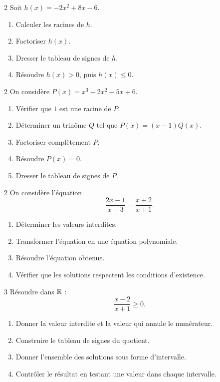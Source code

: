 \begin{exo}{2}
Soit $h(x)=-2x^2+8x-6$.
\begin{enumerate}
  \item Calculer les racines de $h$.
  \item Factoriser $h(x)$.
  \item Dresser le tableau de signes de $h$.
  \item Résoudre $h(x)>0$, puis $h(x)\leq0$.
\end{enumerate}
\end{exo}

\begin{exo}{2}
On considère $P(x)=x^3-2x^2-5x+6$.
\begin{enumerate}
  \item Vérifier que $1$ est une racine de $P$.
  \item Déterminer un trinôme $Q$ tel que $P(x)=(x-1)Q(x)$.
  \item Factoriser complètement $P$.
  \item Résoudre $P(x)=0$.
  \item Dresser le tableau de signes de $P$.
\end{enumerate}
\end{exo}

\begin{exo}{2}
On considère l'équation
\[
  \frac{2x-1}{x-3}=\frac{x+2}{x+1}.
\]
\begin{enumerate}
  \item Déterminer les valeurs interdites.
  \item Transformer l'équation en une équation polynomiale.
  \item Résoudre l'équation obtenue.
  \item Vérifier que les solutions respectent les conditions d'existence.
\end{enumerate}
\end{exo}

\begin{exo}{3}
Résoudre dans $\mathbb{R}$ :
\[
  \frac{x-2}{x+1}\geq0.
\]
\begin{enumerate}
  \item Donner la valeur interdite et la valeur qui annule le numérateur.
  \item Construire le tableau de signes du quotient.
  \item Donner l'ensemble des solutions sous forme d'intervalle.
  \item Contrôler le résultat en testant une valeur dans chaque intervalle.
\end{enumerate}
\end{exo}

